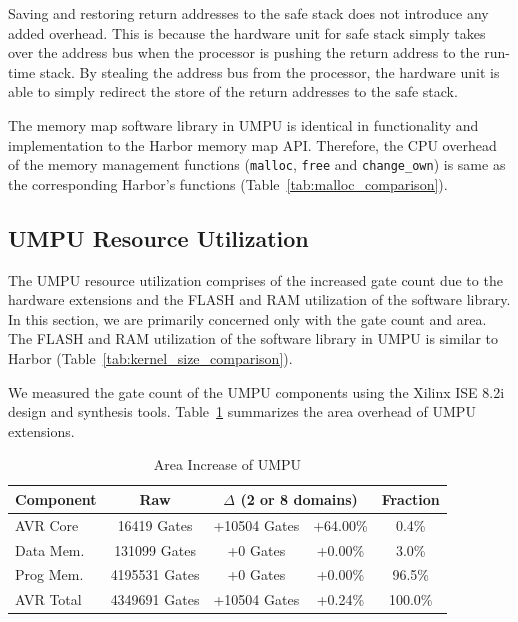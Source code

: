 Saving and restoring return addresses to the safe stack does not
introduce any added overhead.
%
This is because the hardware unit for safe stack simply takes over the
address bus when the processor is pushing the return address to the
run-time stack.
%
By stealing the address bus from the processor, the hardware unit is
able to simply redirect the store of the return addresses to the safe
stack.

The memory map software library in UMPU is identical in functionality
and implementation to the Harbor memory map API.
%
Therefore, the CPU overhead of the memory management functions (\texttt{malloc},
\texttt{free} and \texttt{change\_own}) is same as the corresponding
Harbor's functions (Table~\ref{tab:malloc_comparison}).
%
\subsection{UMPU Resource Utilization}
%
The UMPU resource utilization comprises of the increased gate count
due to the hardware extensions and the FLASH and RAM utilization of
the software library.
%
In this section, we are primarily concerned only with the gate count
and area.
%
The FLASH and RAM utilization of the software library in UMPU is
similar to Harbor (Table~\ref{tab:kernel_size_comparison}).



%
We measured the gate count of the UMPU components using the Xilinx ISE
8.2i~\cite{xilinxlink} design and synthesis tools.
%
Table~\ref{tab:umpuarea} summarizes the area overhead of UMPU extensions.
% 
\begin{table}[htdp]
\centering
\small{\def\X{\hphantom{0}}\def\XX{\X\X}\def\XXX{\XX\X}\def\Y{\raise1pt\hbox{\strut}}
\begin{tabular}{|l|c|c|c|c|}
	\hline
	Component & Raw & \multicolumn{2}{c|}{$\Delta$ (2 or 8 domains)} & Fraction \\
	\hline
	AVR Core   & \XX{}16419 Gates &   +10504 Gates & +64.00\% &\XX{}0.4\%\\
	Data Mem.  & \X{}131099 Gates & \XXX{}+0 Gates &  +0.00\% &\XX{}3.0\%\\
        Prog Mem.  &    4195531 Gates & \XXX{}+0 Gates &  +0.00\% & \X{}96.5\%\\
        AVR Total  &    4349691 Gates &   +10504 Gates &  +0.24\% &   100.0\%\\   
	\hline
\end{tabular}}
\caption{Area Increase of UMPU}
\label{tab:umpuarea}
\end{table}

